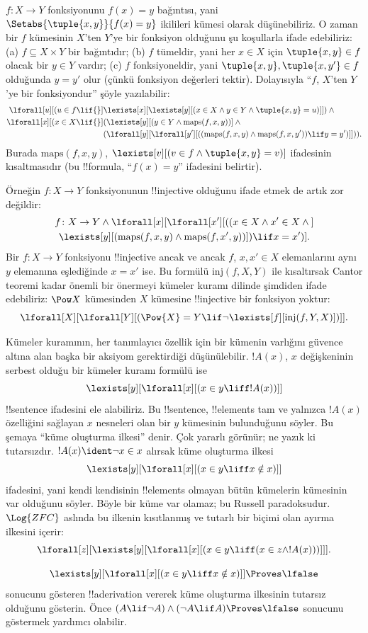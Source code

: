 \documentclass[../../../include/open-logic-section]{subfiles}
\begin{document}
$f\colon X\to Y$ fonksiyonunu $f(x)=y$ bağıntısı, yani
$\Setabs{\tuple{x,y}}{f(x)=y}$ ikilileri kümesi olarak düşünebiliriz.
O zaman bir $f$ kümesinin $X$'ten $Y$'ye bir fonksiyon olduğunu şu
koşullarla ifade edebiliriz: (a) $f\subseteq X\times Y$ bir bağıntıdır;
(b) $f$ tümeldir, yani her $x\in X$ için $\tuple{x,y}\in f$ olacak bir
$y\in Y$ vardır; (c) $f$ fonksiyoneldir, yani $\tuple{x,y},
\tuple{x,y'}\in f$ olduğunda $y=y'$ olur (çünkü fonksiyon değerleri
tektir). Dolayısıyla ``$f$, $X$'ten $Y$'ye bir fonksiyondur'' şöyle
yazılabilir:
\begin{align*}
 \lforall[u][(u \in f \lif {}] & \lexists[x][\lexists[y][(x \in X \land y \in
      Y \land \tuple{x, y} = u)]]) \land {}\\
 \lforall[x][(x \in X \lif {}] &
      (\lexists[y][(y \in Y \land \mathrm{maps}(f, x, y))] \land {}\\
& (\lforall[y][\lforall[y'][((\mathrm{maps}(f, x, y) \land
    \mathrm{maps}(f, x, y')) \lif y = y')]])).
\end{align*}
Burada $\mathrm{maps}(f,x,y)$, $\lexists[v][(v\in f\land
\tuple{x,y}=v)]$ ifadesinin kısaltmasıdır (bu !!{formula},
``$f(x)=y$'' ifadesini belirtir).

Örneğin $f\colon X\to Y$ fonksiyonunun !!{injective} olduğunu ifade
etmek de artık zor değildir:
\begin{multline*}
 f \colon X \to Y \land \lforall[x][\lforall[x'][((x \in X \land x' \in
     X \land {}] \\
 \lexists[y][(\mathrm{maps}(f, x, y) \land \mathrm{maps}(f,
        x', y))]) \lif x = x')].
\end{multline*}
Bir $f\colon X\to Y$ fonksiyonu !!{injective} ancak ve ancak $f$,
$x,x'\in X$ elemanlarını aynı $y$ elemanına eşlediğinde $x=x'$ ise.
Bu formülü $\mathrm{inj}(f,X,Y)$ ile kısaltırsak Cantor teoremi kadar
önemli bir önermeyi kümeler kuramı dilinde şimdiden ifade edebiliriz:
$\Pow X$ kümesinden $X$ kümesine !!{injective} bir fonksiyon yoktur:
\[
\lforall[X][\lforall[Y][(\Pow{X} = Y \lif
    \lnot\lexists[f][\mathrm{inj}(f, Y, X)])]].
\]

Kümeler kuramının, her tanımlayıcı özellik için bir kümenin varlığını
güvence altına alan başka bir aksiyom gerektirdiği düşünülebilir.
$!A(x)$, $x$ değişkeninin serbest olduğu bir kümeler kuramı formülü ise
\[
\lexists[y][\lforall[x][(x \in y \liff !A(x))]]
\]
!!{sentence} ifadesini ele alabiliriz. Bu !!{sentence}, !!{element}s
tam ve yalnızca $!A(x)$ özelliğini sağlayan $x$ nesneleri olan bir $y$
kümesinin bulunduğunu söyler. Bu şemaya ``küme oluşturma ilkesi''
denir. Çok yararlı görünür; ne yazık ki tutarsızdır. $!A(x)\ident
\lnot x\in x$ alırsak küme oluşturma ilkesi
\[
\lexists[y][\lforall[x][(x \in y \liff x \notin x)]]
\]
ifadesini, yani kendi kendisinin !!{element}s olmayan bütün kümelerin
kümesinin var olduğunu söyler. Böyle bir küme var olamaz; bu Russell
paradoksudur. $\Log{ZFC}$ aslında bu ilkenin kısıtlanmış ve tutarlı bir
biçimi olan ayırma ilkesini içerir:
\[
\lforall[z][\lexists[y][\lforall[x][(x \in y \liff (x \in z \land
      !A(x)))]]].
\]

\begin{prob}
\[
\lexists[y][\lforall[x][(x \in y \liff x \notin x)]] \Proves \lfalse
\]
sonucunu gösteren !!a{derivation} vererek küme oluşturma ilkesinin
tutarsız olduğunu gösterin. Önce
$(A\lif\lnot A)\land(\lnot A\lif A)\Proves\lfalse$ sonucunu göstermek
yardımcı olabilir.
\end{prob}
\end{document}
